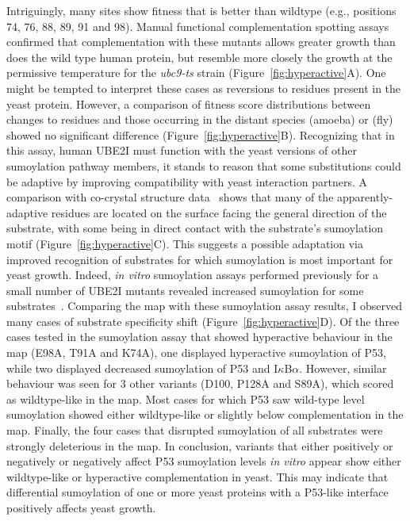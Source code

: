 Intriguingly, many sites show fitness that is better than wildtype (e.g., positions 74, 76, 88, 89, 91 and 98). Manual functional complementation spotting assays confirmed that complementation with these mutants allows greater growth than does the wild type human protein, but resemble more closely the growth at the permissive temperature for the \textit{ubc9-ts} strain (Figure~\ref{fig:hyperactive}A). One might be tempted to interpret these cases as reversions to residues present in the yeast protein. However, a comparison of fitness score distributions between changes to   residues and those occurring in the distant species  (amoeba) or  (fly) showed no significant difference (Figure~\ref{fig:hyperactive}B). Recognizing that in this assay, human UBE2I must function with the yeast versions of other sumoylation pathway members, it stands to reason that some substitutions could be adaptive by improving compatibility with yeast interaction partners. A comparison with co-crystal structure data~\cite{gareau_determinants_2012} shows that many of the apparently-adaptive residues are located on the surface facing the general direction of the substrate, with some being in direct contact with the substrate's sumoylation motif (Figure~\ref{fig:hyperactive}C). This suggests a possible adaptation via improved recognition of substrates for which sumoylation is most important for yeast growth. Indeed, \textit{in vitro} sumoylation assays performed previously for a small number of UBE2I mutants revealed increased sumoylation for some substrates~\cite{bernier-villamor_structural_2002}. Comparing the map with these sumoylation assay results, I observed many cases of substrate specificity shift (Figure~\ref{fig:hyperactive}D). Of the three cases tested in the sumoylation assay that showed hyperactive behaviour in the map (E98A, T91A and K74A), one displayed hyperactive sumoylation of P53, while two displayed decreased sumoylation of P53 and I$\kappa$B$\alpha$. However, similar behaviour was seen for 3 other variants (D100, P128A and S89A), which scored as wildtype-like in the map. Most cases for which P53 saw wild-type level sumoylation showed either wildtype-like or slightly below complementation in the map. Finally, the four cases that disrupted sumoylation of all substrates were strongly deleterious in the map. In conclusion, variants that either positively or negatively or negatively affect P53 sumoylation levels \textit{in vitro} appear show either wildtype-like or hyperactive complementation in yeast. This may indicate that differential sumoylation of one or more yeast proteins with a P53-like interface positively affects yeast growth.


